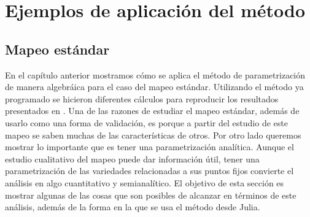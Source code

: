 
\chapter{Ejemplos de aplicación del método}
\label{SeccionEstandar}\section{Mapeo estándar}
En el capítulo anterior mostramos cómo se aplica el método de parametrización de manera algebráica para el caso del mapeo estándar. Utilizando el método ya programado se hicieron diferentes cálculos para reproducir los resultados presentados en \citep{Mireles}. Una de las razones de estudiar el mapeo estándar, además de usarlo como una forma de validación, es porque a partir del estudio de este mapeo se saben muchas de las características de otros. Por otro lado queremos mostrar lo importante que es tener una parametrización analítica. Aunque el estudio cualitativo del mapeo puede dar información útil, tener una parametrización de las variedades relacionadas a sus puntos fijos convierte el análisis en algo cuantitativo y semianalítico. El objetivo de esta sección es mostrar algunas de las cosas que son posibles de alcanzar en términos de este análisis, además de la forma en la que se usa el método desde Julia.\\

